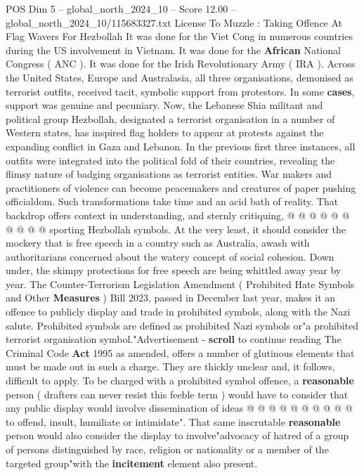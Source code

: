 \begin{textsample}{POS Dim 5 – global\_north\_2024\_10 – Score 12.00 – global\_north\_2024\_10/115683327.txt}  \label{ex:f5_pos_405}
License To Muzzle : Taking Offence At Flag Wavers For Hezbollah It was done for the Viet Cong in numerous countries during the US involvement in Vietnam.
It was done for the \textbf{African} National Congress ( ANC ).
It was done for the Irish Revolutionary Army ( IRA ).
Across the United States, Europe and Australasia, all three organisations, demonised as terrorist outfits, received tacit, symbolic support from protestors.
In some \textbf{cases}, support was genuine and pecuniary.
Now, the Lebanese Shia militant and political group Hezbollah, designated a terrorist organisation in a number of Western states, has inspired flag holders to appear at protests against the expanding conflict in Gaza and Lebanon.
In the previous first three instances, all outfits were integrated into the political fold of their countries, revealing the flimsy nature of badging organisations as terrorist entities.
War makers and practitioners of violence can become peacemakers and creatures of paper pushing officialdom.
Such transformations take time and an acid bath of reality.
That backdrop offers context in understanding, and sternly critiquing, @ @ @ @ @ @ @ @ @ @ sporting Hezbollah symbols.
At the very least, it should consider the mockery that is free speech in a country such as Australia, awash with authoritarians concerned about the watery concept of social cohesion.
Down under, the skimpy protections for free speech are being whittled away year by year.
The Counter-Terrorism Legislation Amendment ( Prohibited Hate Symbols and Other \textbf{Measures} ) Bill 2023, passed in December last year, makes it an offence to publicly display and trade in prohibited symbols, along with the Nazi salute.
Prohibited symbols are defined as prohibited Nazi symbols or"a prohibited terrorist organisation symbol."Advertisement - \textbf{scroll} to continue reading The Criminal Code \textbf{Act} 1995 as amended, offers a number of glutinous elements that must be made out in such a charge.
They are thickly unclear and, it follows, difficult to apply.
To be charged with a prohibited symbol offence, a \textbf{reasonable} person ( drafters can never resist this feeble term ) would have to consider that any public display would involve dissemination of ideas @ @ @ @ @ @ @ @ @ @ to offend, insult, humiliate or intimidate".
That same inscrutable \textbf{reasonable} person would also consider the display to involve"advocacy of hatred of a group of persons distinguished by race, religion or nationality or a member of the targeted group"with the \textbf{incitement} element also present.

\end{textsample}
